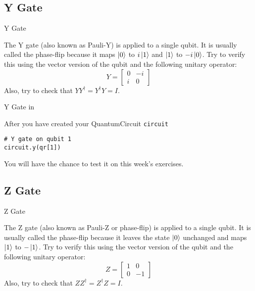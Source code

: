 \documentclass[aspectratio=43]{beamer}
\begin{document}
\subsection{Y Gate}
\begin{frame}{Y Gate}
\begin{card}
    The Y gate (also known as Pauli-Y) is applied to a single qubit. It is usually called the phase-flip because it maps $\ket{0}$ to $i\ket{1}$ and $\ket{1}$ to $-i\ket{0}$. Try to verify this using the vector version of the qubit and the following unitary operator:
    \begin{equation*}
        Y=\begin{bmatrix}0 & -i\\i & 0\end{bmatrix}
    \end{equation*}
    Also, try to check that $YY^\dag=Y^\dag Y = I$.
\end{card}
\pagenumber
\end{frame}

\begin{frame}[fragile]{Y Gate in \qk}
\begin{card}
    After you have created your QuantumCircuit \texttt{circuit}
    \begin{verbatim}
# Y gate on qubit 1
circuit.y(qr[1])
    \end{verbatim}
    \begin{center}
            
    \end{center}
    You will have the chance to test it on this week's exercises.
\end{card}
\end{frame}



\subsection{Z Gate}
\begin{frame}{Z Gate}
\begin{card}
    The Z gate (also known as Pauli-Z or phase-flip) is applied to a single qubit. It is usually called the phase-flip because it leaves the state $\ket{0}$ unchanged and maps $\ket{1}$ to $-\ket{1}$. Try to verify this using the vector version of the qubit and the following unitary operator:
    \begin{equation*}
        Z=\begin{bmatrix}1 & 0\\0 & -1\end{bmatrix}
    \end{equation*}
    Also, try to check that $ZZ^\dag=Z^\dag Z = I$.
\end{card}
\pagenumber
\end{frame}
\end{document}
